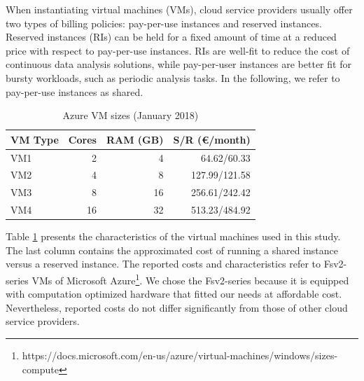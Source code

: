 {When instantiating virtual machines (VMs), cloud service providers usually offer two types of billing policies: pay-per-use instances and reserved instances. Reserved instances (RIs) can be held for a fixed amount of time at a reduced price with respect to pay-per-use instances. RIs are well-fit to reduce the cost of continuous data analysis solutions, while pay-per-user instances are better fit for bursty workloads, such as periodic analysis tasks. In the following, we refer to pay-per-use instances as shared.

\begin{table}[ht]
  \centering
    \caption{Azure VM sizes (January 2018)}
  \begin{tabular}{@{}lrrr@{}} \toprule
  VM Type & Cores & RAM (GB) & S/R (\euro/month)\\
    \midrule
  VM1 & 2 & 4 & 64.62/60.33\\
  VM2 & 4 & 8 & 127.99/121.58\\
  VM3 & 8 & 16 & 256.61/242.42\\
  VM4 & 16 & 32 & 513.23/484.92\\
    \bottomrule
  \end{tabular}
    \label{tab:sizes}
\end{table}

Table \ref{tab:sizes} presents the characteristics of the virtual machines used in this study. The last column contains the approximated cost of running a shared instance versus a reserved instance. 
The reported costs and characteristics refer to Fsv2-series VMs of Microsoft Azure\footnote{https://docs.microsoft.com/en-us/azure/virtual-machines/windows/sizes-compute}. We chose the Fsv2-series because it is equipped with computation optimized hardware that fitted our needs at affordable cost.
Nevertheless, reported costs do not differ significantly from those of other cloud service providers. 

}
